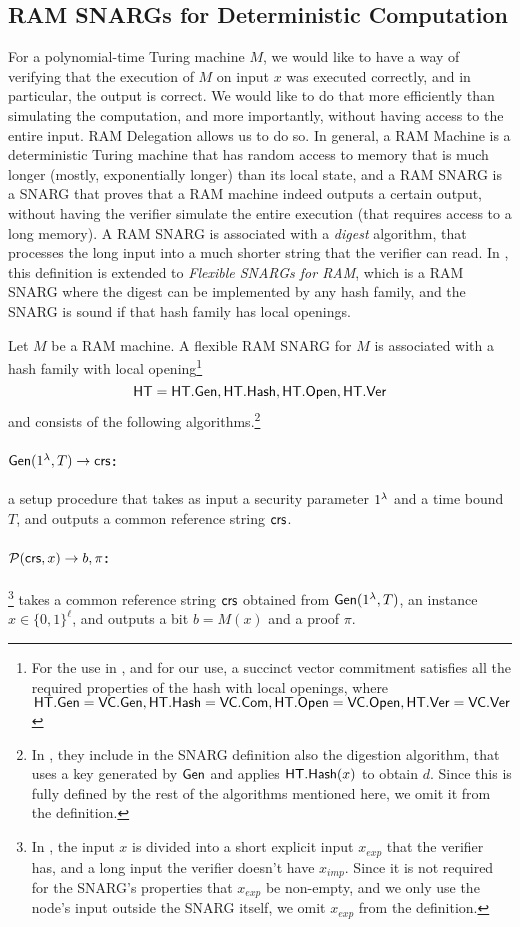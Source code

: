\subsection{RAM SNARGs for Deterministic Computation}\label{app:ramsnargs}
For a polynomial-time Turing machine $M$, we would like to have a way of verifying that the execution of $M$ on input $x$ was executed correctly, and in particular, the output is correct. We would like to do that more efficiently than simulating the computation, and more importantly, without having access to the entire input. RAM Delegation allows us to do so. In general, a RAM Machine is a deterministic Turing machine that has random access to memory that is much longer (mostly, exponentially longer) than its local state, and a RAM SNARG is a SNARG that proves that a RAM machine indeed outputs a certain output, without having the verifier simulate the entire execution (that requires access to a long memory). A RAM SNARG is associated with a \emph{digest} algorithm, that processes the long input into a much shorter string that the verifier can read. In \cite{cryptoeprint:2022/1320}, this definition is extended to \emph{Flexible SNARGs for RAM}, which is a RAM SNARG where the digest can be implemented by any hash family, and the SNARG is sound if that hash family has local openings.

Let $M$ be a RAM machine. A flexible RAM SNARG for $M$ is associated with a hash family with local opening\footnote{
For the use in \cite{cryptoeprint:2022/1320}, and for our use, a succinct vector commitment satisfies all the required properties of the hash with local openings, where $\mathsf{HT}.\mathsf{Gen} = \mathsf{VC}.\mathsf{Gen}, \mathsf{HT}.\mathsf{Hash} = \mathsf{VC}.\mathsf{Com}, \mathsf{HT}.\mathsf{Open} = \mathsf{VC}.\mathsf{Open}, \mathsf{HT}.\mathsf{Ver} = \mathsf{VC}.\mathsf{Ver}$
}
$$\mathsf{HT} = \mathsf{HT}.\mathsf{Gen}, \mathsf{HT}.\mathsf{Hash}, \mathsf{HT}.\mathsf{Open}, \mathsf{HT}.\mathsf{Ver}$$ and consists of the following  algorithms.\footnote{
In \cite{cryptoeprint:2022/1320}, they include in the SNARG definition also the digestion algorithm, that uses a key generated by $\mathsf{Gen}$ and applies $\mathsf{HT}.\mathsf{Hash}(x)$ to obtain $d$. Since this is fully defined by the rest of the algorithms mentioned here, we omit it from the definition.
}
\paragraph{$\Gen(1^\secpar, T)\to \var{\crs%
}$:} a setup procedure that takes as input a security parameter $1^\lambda$ and a time bound $T$, and outputs a common reference string $\mathit{ \mathsf{crs} }$.

\paragraph{$\mathcal{P}(\mathit{ \mathsf{crs} }, x)\to b, \pi$:}\footnote{
In \cite{cryptoeprint:2022/1320}, the input $x$ is divided into a short explicit input $x_{exp}$ that the verifier has, and a long input the verifier doesn't have $x_{imp}$. Since it is not required for the SNARG's properties that $x_{exp}$ be non-empty, and we only use the node's input outside the SNARG itself, we omit $x_{exp}$ from the definition.
}
takes a common reference string $\mathit{ \mathsf{crs} }$ obtained from $\mathsf{Gen}(1^{\lambda}, T)$,
an instance $x\in\{0,1\}^\ell$, and outputs a bit $b = M(x)$ and a proof $\pi$.

